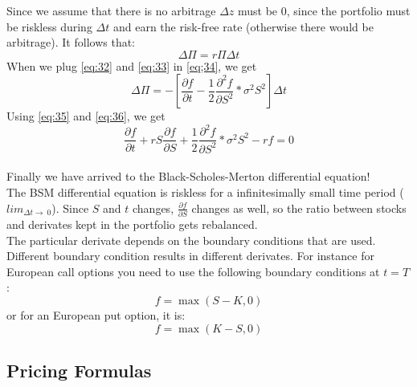 \documentclass{article}
\begin{document}
Since we assume that there is no arbitrage $\Delta z$ must be 0, since the portfolio must be riskless during $\Delta t$ and earn the risk-free rate (otherwise there would be arbitrage). It follows that:
\begin{equation}\label{eq:35}
    \Delta \Pi = r \Pi \Delta t
\end{equation}
When we plug \ref{eq:32} and \ref{eq:33} in \ref{eq;34}, we get
\begin{equation}\label{eq:36}
    \Delta \Pi = - \left[\frac{\partial f }{\partial t} - \frac{1}{2}\frac{\partial^{2} f }{\partial S^{2}} * \sigma^{2} S^{2}\right] \Delta t
\end{equation}
Using \ref{eq:35} and \ref{eq:36}, we get 
\begin{equation}
    \frac{\partial f }{\partial t} + r S \frac{\partial f}{\partial S} +\frac{1}{2}\frac{\partial^{2} f }{\partial S^{2}} * \sigma^{2} S^{2} - rf = 0
\end{equation}\\
Finally we have arrived to the Black-Scholes-Merton differential equation!\\[3ex]
The BSM differential equation is riskless for a infinitesimally small time period ($lim_{\Delta t\to\ 0}$). Since $S$ and $t$ changes, $\frac{\partial f}{\partial S}$ changes as well, so the ratio between stocks and derivates kept in the portfolio gets rebalanced. \\[2ex]
The particular derivate depends on the boundary conditions that are used. Different boundary condition results in different derivates. For instance for European call options you need to use the following boundary conditions at $t=T$:
\begin{equation*}
    f = \max (S - K, 0)
\end{equation*}
or for an European put option, it is:
\begin{equation*}
    f = \max (K - S, 0)
\end{equation*}
\subsection{Pricing Formulas}
\end{document}
